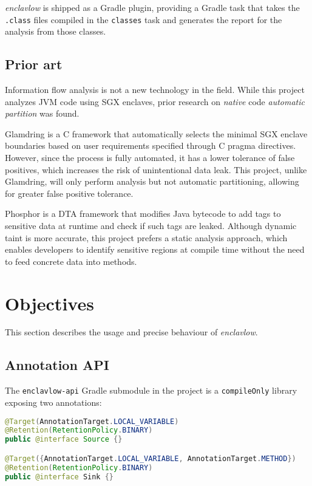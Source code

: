 \documentclass[a4paper, 12pt]{article}
\def\pname{\emph{enclavlow}}
\def\code#1{\colorbox{code}{\texttt{\footnotesize #1}}}
\begin{document}
\pname{} is shipped as a Gradle plugin,
providing a Gradle task that
takes the \code{*.class} files compiled in the \code{classes} task
and generates the report for the analysis from those classes.

\subsection{Prior art}
Information flow analysis is not a new technology in the field.
While this project analyzes JVM code using SGX enclaves,
prior research on \emph{native} code \emph{automatic partition} was found.

Glamdring \cite{glamdring} is a C framework that
automatically selects the minimal SGX enclave boundaries
based on user requirements specified through C pragma directives.
However, since the process is fully automated,
it has a lower tolerance of false positives,
which increases the risk of unintentional data leak.
This project, unlike Glamdring, will only perform analysis but not automatic partitioning,
allowing for greater false positive tolerance.

Phosphor \cite{BellJonathan2014Pidd} is a DTA framework
that modifies Java bytecode to add tags to sensitive data at runtime
and check if such tags are leaked.
Although dynamic taint is more accurate,
this project prefers a static analysis approach,
which enables developers to identify sensitive regions at compile time
without the need to feed concrete data into methods.

\section{Objectives}
This section describes the usage and precise behaviour of \pname{}.

\subsection{Annotation API}
The \code{enclavlow-api} Gradle submodule in the project
is a \code{compileOnly} library exposing two annotations:

\begin{lstlisting}[style=j, language=java, caption={Definition of @Source and @Sink}]
@Target(AnnotationTarget.LOCAL_VARIABLE)
@Retention(RetentionPolicy.BINARY)
public @interface Source {}

@Target({AnnotationTarget.LOCAL_VARIABLE, AnnotationTarget.METHOD})
@Retention(RetentionPolicy.BINARY)
public @interface Sink {}
\end{lstlisting}
\end{document}
